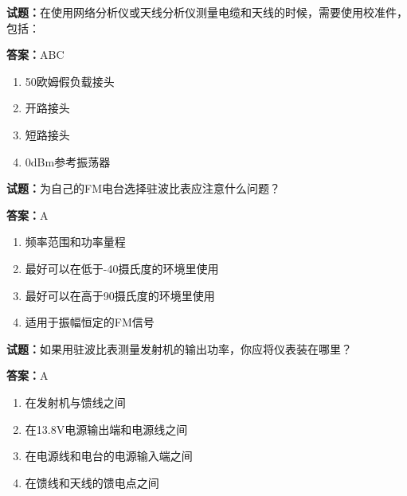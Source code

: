 \documentclass{ctexbook}
\begin{document}



\vspace{1em}

\textbf{试题：}在使用网络分析仪或天线分析仪测量电缆和天线的时候，需要使用校准件，包括： 

\textbf{答案：}ABC 

\begin{enumerate}[leftmargin=3em]
  \item 50欧姆假负载接头 

  \item 开路接头 

  \item 短路接头 

  \item 0dBm参考振荡器 

\end{enumerate}





\vspace{1em}

\textbf{试题：}为自己的FM电台选择驻波比表应注意什么问题？ 

\textbf{答案：}A 

\begin{enumerate}[leftmargin=3em]
  \item 频率范围和功率量程 

  \item 最好可以在低于-40摄氏度的环境里使用 

  \item 最好可以在高于90摄氏度的环境里使用 

  \item 适用于振幅恒定的FM信号 


\end{enumerate}





\vspace{1em}

\textbf{试题：}如果用驻波比表测量发射机的输出功率，你应将仪表装在哪里？ 

\textbf{答案：}A 

\begin{enumerate}[leftmargin=3em]
  \item 在发射机与馈线之间 

  \item 在13.8V电源输出端和电源线之间 

  \item 在电源线和电台的电源输入端之间 

  \item 在馈线和天线的馈电点之间 

\end{enumerate}
\end{document}
